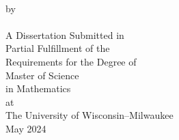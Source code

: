 \begin{center}
{\Large \doublespacing \mytitle}
    \\
    \vspace{0.6\baselineskip}
    by\\
    \myauthor \\
    \vspace{2in}
    A Dissertation Submitted in\\
    Partial Fulfillment of the\\
    Requirements for the Degree of\\
    \vspace{0.5in}
    Master of Science\\
    in Mathematics\\
    \vspace{0.5in}
    at\\
    The University of Wisconsin--Milwaukee\\
    May 2024\\
\end{center}